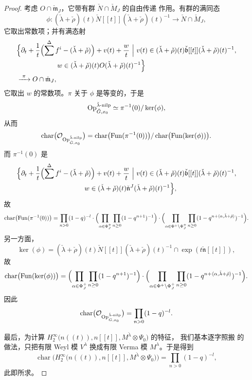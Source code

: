 \begin{proof}
考虑 $O\cap \check{\mathfrak{m}}_J$，它带有群 $\check N\cap \check M_J$ 的自由传递
作用。有群的满同态
\[
\phi\colon (\check\lambda+\check\rho)(t)\check N[[t]](\check\lambda+\check\rho)(t)^{-1}
\longrightarrow \check N\cap \check M_J,
\]
它取出常数项；并有满态射
\begin{align}
&\Bigl\{\partial_t+\frac{1}{t}\Bigl(\sum^{\Delta}f^i-(\check\lambda+\check\rho)\Bigr)
+v(t)+\frac{w}{t}\ \Big|\
v(t)\in (\check\lambda+\check\rho)(t)\check{\mathfrak{b}}[[t]](\check\lambda+\check\rho)(t)^{-1},\notag\\
&\qquad\qquad\qquad
w\in (\check\lambda+\check\rho)(t)O(\check\lambda+\check\rho)(t)^{-1}\Bigr\}
\label{eq:3.4.9}\\
&\xrightarrow{\ \pi\ } O\cap \check{\mathfrak{m}}_J,
\label{eq:3.4.10}
\end{align}
它取出 $w$ 的常数项。$\pi$ 关于 $\phi$ 是等变的，于是
\[
\mathrm{Op}^{\check\lambda\text{-}\mathrm{nilp}}_{\check G,x_0}
\simeq \pi^{-1}(0)/\ker(\phi),
\]
从而
\[
\operatorname{char}\bigl(\mathcal{O}_{\mathrm{Op}^{\check\lambda\text{-}\mathrm{nilp}}
_{\check G,x_0}}\bigr)
=\operatorname{char}\bigl(\operatorname{Fun}(\pi^{-1}(0))\bigr)/
\operatorname{char}\bigl(\operatorname{Fun}(\ker(\phi))\bigr).
\]
而 $\pi^{-1}(0)$ 是
\begin{align*}
&\Bigl\{\partial_t+\frac{1}{t}\Bigl(\sum^{\Delta}f^i-(\check\lambda+\check\rho)\Bigr)
+v(t)+\frac{w}{t}\ \Big|\
v(t)\in (\check\lambda+\check\rho)(t)\check{\mathfrak{b}}[[t]](\check\lambda+\check\rho)(t)^{-1},\\
&\qquad\qquad\qquad\qquad\qquad
w\in (\check\lambda+\check\rho)(t)\check{\mathfrak{n}}^J(\check\lambda+\check\rho)(t)^{-1}\Bigr\},
\end{align*}
故
\[
\operatorname{char}\bigl(\operatorname{Fun}(\pi^{-1}(0))\bigr)
=\prod_{n>0}(1-q)^{-l}\cdot
\Bigl(\prod_{\alpha\in \Phi^{+}_J}\prod_{n\geq 0}(1-q^{n+1})^{-1}\Bigr)\cdot
\Bigl(\prod_{\alpha\in \Phi^{+}\setminus \Phi^{+}_J}
\prod_{n\geq 0}(1-q^{n+\langle \alpha,\check\lambda+\check\rho\rangle})^{-1}\Bigr).
\]
另一方面，
\[
\ker(\phi)=(\check\lambda+\check\rho)(t)\check N[[t]](\check\lambda+\check\rho)(t)^{-1}
\cap \exp(t\check{\mathfrak{n}}[[t]]),
\]
故
\[
\operatorname{char}\bigl(\operatorname{Fun}(\ker(\phi))\bigr)
=\Bigl(\prod_{\alpha\in \Phi^{+}_J}\prod_{n\geq 0}(1-q^{n+1})^{-1}\Bigr)\cdot
\Bigl(\prod_{\alpha\in \Phi^{+}\setminus \Phi^{+}_J}
\prod_{n\geq 0}(1-q^{n+\langle \alpha,\check\lambda+\check\rho\rangle})^{-1}\Bigr).
\]
因此
\[
\operatorname{char}\bigl(\mathcal{O}_{\mathrm{Op}^{\check\lambda\text{-}\mathrm{nilp}}
_{\check G,x_0}}\bigr)=\prod_{n>0}(1-q)^{-l}.
\]

最后，为计算
$H^{\infty}_2\bigl(n((t)),n[[t]],M^{\check\lambda}\otimes \Psi_0\bigr)$ 的特征，
我们基本逐字照搬 \cite[第 5.2 节]{FG10} 的做法，只把有限 Weyl 模 $V^{\lambda}$ 换成有限
Verma 模 $M^{\lambda}$。于是得到
\[
\operatorname{char}\bigl(H^{\infty}_2\bigl(n((t)),n[[t]],
M^{\check\lambda}\otimes \Psi_0\bigr)\bigr)=\prod_{n>0}(1-q)^{-l},
\]
此即所求。
\end{proof}

